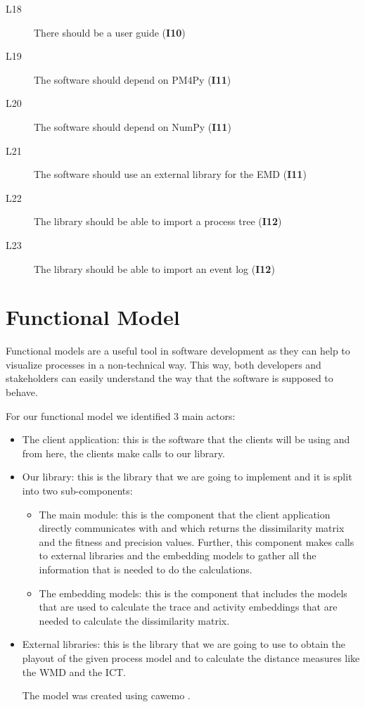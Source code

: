 \documentclass{article}
\begin{document}
\begin{description}
\item [L18] There should be a user guide (\textbf{I10})
\item [L19] The software should depend on PM4Py \cite{pm4py} (\textbf{I11})
\item [L20] The software should depend on NumPy \cite{numpy} (\textbf{I11})
\item [L21] The software should use an external library for the EMD (\textbf{I11})
\item [L22] The library should be able to import a process tree (\textbf{I12})
\item [L23] The library should be able to import an event log (\textbf{I12})
\end{description}

\section{Functional Model}

Functional models are a useful tool in software development as they can help to visualize processes in a non-technical way. This way, both developers and stakeholders can easily understand the way that the software is supposed to behave.

For our functional model we identified 3 main actors:

\begin{itemize}
    \item The client application: this is the software that the clients will be using and from here, the clients make calls to our library.
    \item Our library: this is the library that we are going to implement and it is split into two sub-components:
    \begin{itemize}
        \item The main module: this is the component that the client application directly communicates with and which returns the dissimilarity matrix and the fitness and precision values. Further, this component makes calls to external libraries and the embedding models to gather all the information that is needed to do the calculations.
        \item The embedding models: this is the component that includes the models that are used to calculate the trace and activity embeddings that are needed to calculate the dissimilarity matrix.
    \end{itemize}
    \item External libraries: this is the library that we are going to use to obtain the playout of the given process model and to calculate the distance measures like the WMD and the ICT.
    
    The model was created using cawemo \cite{cawemo}.
\end{itemize}
\end{document}
